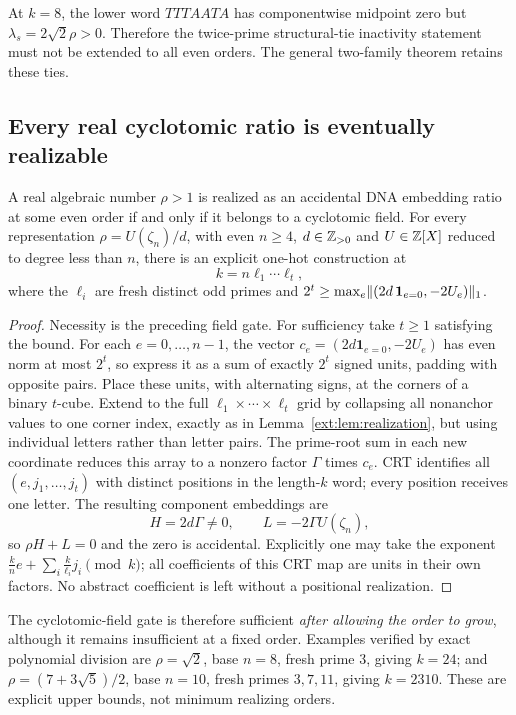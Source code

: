 \begin{remark}
At $k=8$, the lower word $TTTAATA$ has componentwise midpoint zero but $\lambda_s=2\sqrt2\rho>0$. Therefore the twice-prime structural-tie inactivity statement must not be extended to all even orders. The general two-family theorem retains these ties.
\end{remark}

\subsection{Every real cyclotomic ratio is eventually realizable}\label{ext:sec:algebraic}
\begin{theorem}\label{ext:thm:algebraic}
A real algebraic number $\rho>1$ is realized as an accidental DNA embedding ratio at some even order if and only if it belongs to a cyclotomic field. For every representation $\rho=U(\zeta_n)/d$, with even $n\ge4$, $d\in\mathbb Z_{>0}$ and $U\in\mathbb Z[X]$ reduced to degree less than $n$, there is an explicit one-hot construction at
\[
k=n\ell_1\cdots\ell_t,
\]
where the $\ell_i$ are fresh distinct odd primes and $2^t\ge\max_e\lVert(2d\,\mathbf1_{e=0},-2U_e)\rVert_1$.
\end{theorem}
\begin{proof}
Necessity is the preceding field gate. For sufficiency take $t\ge1$ satisfying the bound. For each $e=0,\ldots,n-1$, the vector $c_e=(2d\mathbf1_{e=0},-2U_e)$ has even norm at most $2^t$, so express it as a sum of exactly $2^t$ signed units, padding with opposite pairs. Place these units, with alternating signs, at the corners of a binary $t$-cube. Extend to the full $\ell_1\times\cdots\times\ell_t$ grid by collapsing all nonanchor values to one corner index, exactly as in Lemma~\ref{ext:lem:realization}, but using individual letters rather than letter pairs. The prime-root sum in each new coordinate reduces this array to a nonzero factor $\Gamma$ times $c_e$. CRT identifies all $(e,j_1,\ldots,j_t)$ with distinct positions in the length-$k$ word; every position receives one letter. The resulting component embeddings are
\[
H=2d\Gamma\ne0,\qquad L=-2\Gamma U(\zeta_n),
\]
so $\rho H+L=0$ and the zero is accidental. Explicitly one may take the exponent $\frac{k}{n}e+\sum_i\frac{k}{\ell_i}j_i\pmod k$; all coefficients of this CRT map are units in their own factors. No abstract coefficient is left without a positional realization.
\end{proof}
The cyclotomic-field gate is therefore sufficient \emph{after allowing the order to grow}, although it remains insufficient at a fixed order. Examples verified by exact polynomial division are $\rho=\sqrt2$, base $n=8$, fresh prime $3$, giving $k=24$; and $\rho=(7+3\sqrt5)/2$, base $n=10$, fresh primes $3,7,11$, giving $k=2310$. These are explicit upper bounds, not minimum realizing orders.


